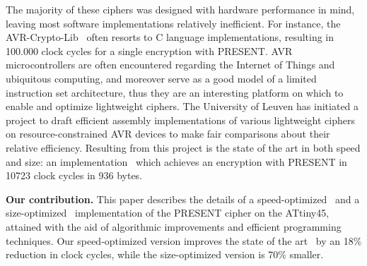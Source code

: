 \documentclass[11pt]{llncs2e} %
\begin{document}
The majority of these ciphers was designed with hardware performance in mind, leaving most software implementations relatively inefficient. For instance, the AVR-Crypto-Lib~\cite{avr_crypto_lib} often resorts to C language implementations, resulting in 100.000 clock cycles for a single encryption with PRESENT.
AVR microcontrollers are often encountered regarding the Internet of Things and ubiquitous computing, and moreover serve as a good model of a limited instruction set architecture, thus they are an interesting platform on which to enable and optimize lightweight ciphers.
The University of Leuven has initiated a project to draft efficient assembly implementations of various lightweight ciphers on resource-constrained AVR devices to make fair comparisons about their relative efficiency.
Resulting from this project is the state of the art in both speed and size: an implementation~\cite{eisenbarth2012compact} which achieves an encryption with PRESENT in 10723 clock cycles in 936 bytes.

\textbf{Our contribution.} This paper describes the details of a speed-optimized~\cite{kostas_code} and a size-optimized~\cite{aram_code} implementation of the PRESENT cipher on the ATtiny45, attained with the aid of algorithmic improvements and efficient programming techniques.
Our speed-optimized version improves the state of the art~\cite{eisenbarth2012compact} by an 18\% reduction in clock cycles, while the size-optimized version is 70\% smaller.
\end{document}
